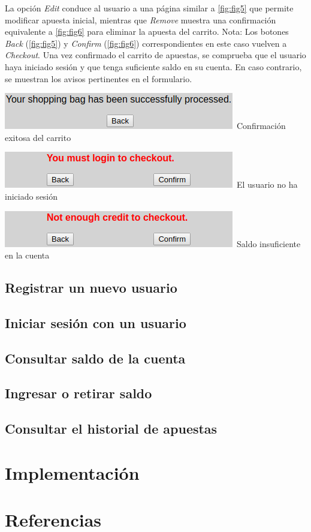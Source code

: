 \documentclass{article}
\newcommand{\cmark}{\ding{51}}
\newcommand{\xmark}{\ding{55}}
\begin{document}
La opción \textit{Edit} conduce al usuario a una página similar a \autoref{fig:fig5} que permite modificar apuesta inicial, mientras que \textit{Remove} muestra una confirmación equivalente a \autoref{fig:fig6} para eliminar la apuesta del carrito.
\smallskip\newline
Nota: Los botones \textit{Back} (\autoref{fig:fig5}) y \textit{Confirm} (\autoref{fig:fig6}) correspondientes en este caso vuelven a \textit{Checkout}.
\bigskip\newline
Una vez confirmado el carrito de apuestas, se comprueba que el usuario haya iniciado sesión y que tenga suficiente saldo en su cuenta. En caso contrario, se muestran los avisos pertinentes en el formulario.
\begin{multicols}{3}
    \begin{center}
        \includegraphics[width=.975\linewidth]{checkout4}
        \cmark\,Confirmación exitosa del carrito
    \end{center}
    \columnbreak
    \begin{center}
        \includegraphics[width=.975\linewidth]{checkout5}
        \xmark\,El usuario no ha iniciado sesión
    \end{center}
    \columnbreak
    \begin{center}
        \includegraphics[width=.975\linewidth]{checkout6}
        \xmark\,Saldo insuficiente en la cuenta
    \end{center}
\end{multicols}
\subsection{Registrar un nuevo usuario}
\subsection{Iniciar sesión con un usuario}
\subsection{Consultar saldo de la cuenta}
\subsection{Ingresar o retirar saldo}
\subsection{Consultar el historial de apuestas}
\section{Implementación}
\section{Referencias}
\end{document}
